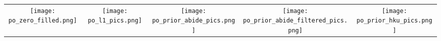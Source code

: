 
\begin{tabular}{c @{\hskip 0pt} c @{\hskip 0pt} c @{\hskip 0pt} c @{\hskip 0pt} c }
    \texttt{[image: po\_zero\_filled.png]}&
    \texttt{[image: po\_l1\_pics.png]}&
    \texttt{[image: po\_prior\_abide\_pics.png]}&
    \texttt{[image: po\_prior\_abide\_filtered\_pics.png]}&
    \texttt{[image: po\_prior\_hku\_pics.png]}
   \end{tabular}